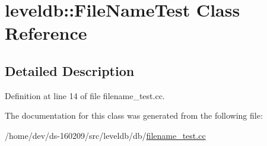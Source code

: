 \hypertarget{classleveldb_1_1_file_name_test}{}\section{leveldb\+:\+:File\+Name\+Test Class Reference}
\label{classleveldb_1_1_file_name_test}


\subsection{Detailed Description}


Definition at line 14 of file filename\+\_\+test.\+cc.



The documentation for this class was generated from the following file\+:\begin{DoxyCompactItemize}
\item 
/home/dev/ds-\/160209/src/leveldb/db/\hyperlink{filename__test_8cc}{filename\+\_\+test.\+cc}\end{DoxyCompactItemize}
